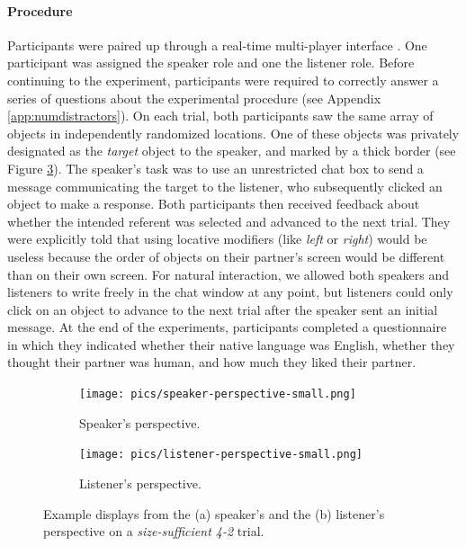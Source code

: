 \documentclass[11pt]{article}
\newcommand{\figref}[1]{Figure \ref{#1}}
\newcommand{\appref}[1]{Appendix \ref{#1}}
\begin{document}
\paragraph{Procedure}

Participants were paired up through a real-time multi-player interface \cite{Hawkins15_RealTimeWebExperiments}. 
One participant was assigned the speaker role and one the listener role. %
Before continuing to the experiment, participants were required to correctly answer a series of questions about the experimental procedure (see \appref{app:numdistractors}). 
On each trial, both participants saw the same array of objects in independently randomized locations.
One of these objects was privately designated as the \emph{target} object to the speaker, and marked by a thick border (see \figref{fig:speakerlistenerperspective}).
The speaker's task was to use an unrestricted chat box to send a message communicating the target to the listener, who subsequently clicked an object to make a response. 
Both participants then received feedback about whether the intended referent was selected and advanced to the next trial.
They were explicitly told that using locative modifiers (like \emph{left} or \emph{right}) would be useless because the order of objects on their partner's screen would be different than on their own screen.
For natural interaction, we allowed both speakers and listeners to write freely in the chat window at any point, but listeners could only click on an object to advance to the next trial after the speaker sent an initial message. 
At the end of the experiments, participants completed a questionnaire in which they indicated whether their native language was English, whether they thought their partner was human, and how much they liked their partner.

\begin{figure}
\begin{subfigure}{.5\textwidth}
\texttt{[image: pics/speaker-perspective-small.png]}
\caption{Speaker's perspective.}
\label{fig:speakerpersp}
\end{subfigure}
\begin{subfigure}{.5\textwidth}
\texttt{[image: pics/listener-perspective-small.png]}
\caption{Listener's perspective.}
\label{fig:listenerpersp}
\end{subfigure}
\caption{Example displays from the  (a) speaker's and the (b) listener's perspective on a \emph{size-sufficient 4-2} trial.}
\label{fig:speakerlistenerperspective}
\end{figure}
\end{document}
